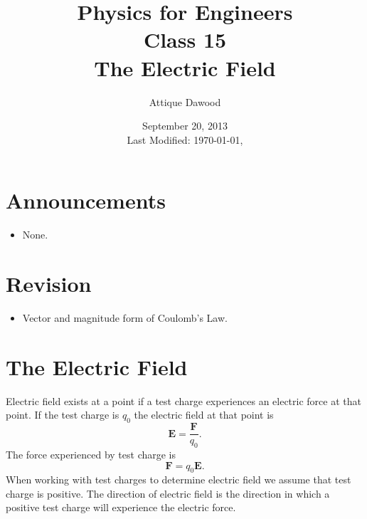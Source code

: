 \documentclass[12pt,a4paper]{article}
\title{\vspace{-2cm}Physics for Engineers\\Class 15\\The Electric Field}
\author{Attique Dawood}
\date{September 20, 2013\\[0.2cm] Last Modified: \today, \currenttime}
\begin{document}
\maketitle
\section{Announcements}
\begin{itemize}
\item None.
\end{itemize}
\section{Revision}
\begin{itemize}
\item Vector and magnitude form of Coulomb's Law.
\end{itemize}
\section{The Electric Field}
Electric field exists at a point if a test charge experiences an electric force at that point. If the test charge is $q_0$ the electric field at that point is
\begin{equation}
\textbf{E}=\dfrac{\textbf{F}}{q_0}.
\end{equation}
The force experienced by test charge is
\begin{equation}
\textbf{F}=q_0\textbf{E}.
\end{equation}
When working with test charges to determine electric field we assume that test charge is positive. The direction of electric field is the direction in which a positive test charge will experience the electric force.
\end{document}
